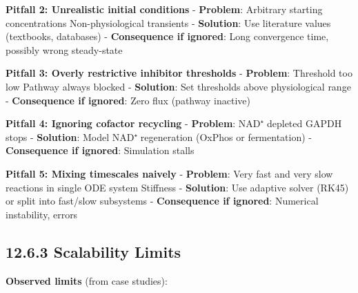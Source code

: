 \textbf{Pitfall 2: Unrealistic initial conditions} - \textbf{Problem}:
Arbitrary starting concentrations \textrightarrow Non-physiological transients -
\textbf{Solution}: Use literature values (textbooks, databases) -
\textbf{Consequence if ignored}: Long convergence time, possibly wrong
steady-state

\textbf{Pitfall 3: Overly restrictive inhibitor thresholds} -
\textbf{Problem}: Threshold too low \textrightarrow Pathway always blocked -
\textbf{Solution}: Set thresholds above physiological range -
\textbf{Consequence if ignored}: Zero flux (pathway inactive)

\textbf{Pitfall 4: Ignoring cofactor recycling} - \textbf{Problem}: NAD⁺
depleted \textrightarrow GAPDH stops - \textbf{Solution}: Model NAD⁺ regeneration
(OxPhos or fermentation) - \textbf{Consequence if ignored}: Simulation
stalls

\textbf{Pitfall 5: Mixing timescales naively} - \textbf{Problem}: Very
fast and very slow reactions in single ODE system \textrightarrow Stiffness -
\textbf{Solution}: Use adaptive solver (RK45) or split into fast/slow
subsystems - \textbf{Consequence if ignored}: Numerical instability,
errors

\hypertarget{scalability-limits}{%
\subsection{12.6.3 Scalability Limits}\label{scalability-limits}}

\textbf{Observed limits} (from case studies):

